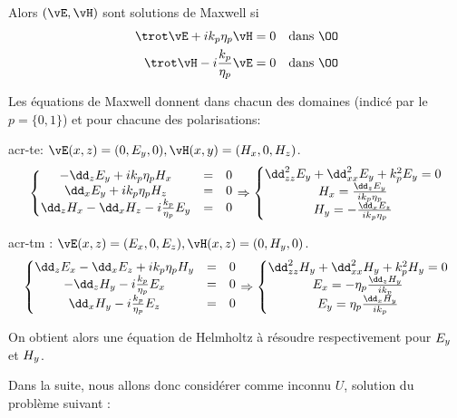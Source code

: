 Alors \((\vE,\vH)\) sont solutions de Maxwell si 
\begin{align}
\label{eq:coeffs_ref:maxwell-E}
\trot \vE + i k_p \eta_p \vH &= 0 && \text{dans \(\OO\)}\\
\label{eq:coeffs_ref:maxwell-H}
\trot \vH - i \frac{k_p}{\eta_p} \vE &= 0 && \text{dans \(\OO\)}
\end{align}

Les équations de Maxwell donnent dans chacun des domaines (indicé par le \(p = \lbrace0,1\rbrace\)) et pour chacune des polarisations:

\Gls{acr-te}: \( \vE(\x,\z) = (0,E_y,0), \vH(\x,\y) = (H_x,0,H_z)\). 
\[
\left\lbrace 
\begin{matrix}
-\dd_{\z} E_\y + i k_p \eta_p H_\x & = & 0 \\
\dd_{\x} E_\y + i k_p \eta_p H_\z &= & 0 \\
\dd_{\z} H_\x- \dd_{\x} H_\z - i\frac{k_p}{\eta_p} E_\y & = & 0\\
\end{matrix}
\right.
\Rightarrow
\left\lbrace
\begin{matrix}
\dd_{\z\z}^2 E_\y + \dd_{\x\x}^2 E_\y + k_p^2 E_\y = 0\\
H_\x = \frac{\dd_{\z} E_\y}{i k_p \eta_p }\\
H_\y =  -\frac{\dd_{\x} E_\z}{i k_p \eta_p }
\end{matrix}
\right.
\]

\Gls{acr-tm} : \( \vE(\x,\z) = (E_\x,0,E_\z), \vH(\x,\z) = (0,H_\y,0)\). 
\[
\left\lbrace 
\begin{matrix}
\dd_{\z} E_\x - \dd_{\x} E_\z + i k_p \eta_p  H_\y &= & 0 \\
- \dd_{\z} H_\y - i\frac{k_p}{\eta_p} E_\x & = & 0\\
\dd_{\x} H_\y -i\frac{k_p}{\eta_p} E_\z &=&0\\
\end{matrix}
\right.
\Rightarrow
\left\lbrace
\begin{matrix}
\dd_{\z\z}^2 H_\y + \dd_{\x\x}^2 H_\y + k_p^2 H_\y = 0\\
E_\x = -\eta_p\frac{\dd_{\z} H_\y}{i k_p}\\
E_\y = \eta_p\frac{\dd_{\x} H_\y}{i k_p}
\end{matrix}
\right.
\]

On obtient alors une équation de Helmholtz à résoudre respectivement pour \(E_{y}\) et \(H_{y}\).

Dans la suite, nous allons donc considérer comme inconnu \(U\), solution du problème suivant : 

